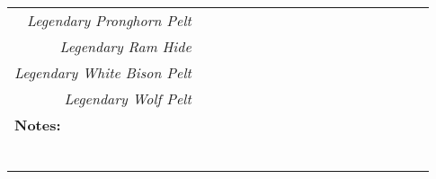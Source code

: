 \documentclass{article}
\begin{document}
\begin{footnotesize}
\begin{tabular}{|r|c|c|c|c|c|c|c|c|c|c|c|c|c|c|c|c|}
	\cline{0-1}
	\textit{Legendary Pronghorn Pelt} & \\
	\cline{0-1}
	\textit{Legendary Ram Hide} & \\
	\cline{0-1}
	\textit{Legendary White Bison Pelt} & \\
	\cline{0-1}
	\textit{Legendary Wolf Pelt} & \\
	\cline{0-1}
	\multicolumn{0}{|l|}{\textbf{Notes:}} \\
	\\
	\\
	\\
	\\
	\\
	\\
	\cline{0-0}
\end{tabular}
	\end{footnotesize}
\end{document}

